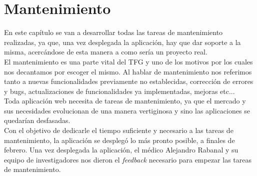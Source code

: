 \chapter{Mantenimiento}

En este capítulo se van a desarrollar todas las tareas de mantenimiento realizadas, ya que, una vez desplegada la aplicación, hay que dar soporte a la misma, acercándose de esta manera a como sería un proyecto real. \\

El mantenimiento es una parte vital del TFG y uno de los motivos por los cuales nos decantamos por escoger el mismo. Al hablar de mantenimiento nos referimos tanto a nuevas funcionalidades previamente no establecidas, corrección de errores y bugs, actualizaciones de funcionalidades ya implementadas, mejoras etc... \\

Toda aplicación web necesita de tareas de mantenimiento, ya que el mercado y sus necesidades evolucionan de una manera vertiginosa y sino las aplicaciones se quedarían desfasadas. \\

Con el objetivo de dedicarle el tiempo suficiente y necesario a las tareas de mantenimiento, la aplicación se desplegó lo más pronto posible, a finales de febrero.
Una vez desplegada la aplicación, el médico Alejandro Rabanal y su equipo de investigadores nos dieron el \textit{feedback} necesario para empezar las tareas de mantenimiento. \\

